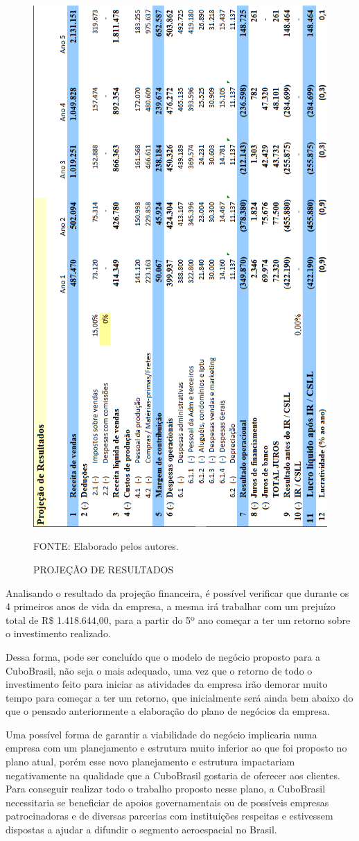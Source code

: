 \documentclass[
	12pt,				%
	openright,			%
	oneside,			%
	a4paper,			%
	english,			%
	french,				%
	spanish,			%
	brazil				%
	]{abntex2}
\begin{document}
	\begin{figure}[th]
		\caption{PROJEÇÃO DE RESULTADOS}
		\label{resultados}
		\centering
		\includegraphics[width=0.6\linewidth]{./figs/resultados}
		
		\begin{small}
			FONTE: Elaborado pelos autores.
		\end{small}
	\end{figure}
	\pagebreak
	
	Analisando o resultado da projeção financeira, é possível verificar que durante os 4 primeiros anos de vida da empresa, a mesma irá trabalhar com um prejuízo total de R\$ 1.418.644,00, para a partir do 5º ano começar a ter um retorno sobre o investimento realizado.
	
	Dessa forma, pode ser concluído que o modelo de negócio proposto para a CuboBrasil, não seja o mais adequado, uma vez que o retorno de todo o investimento feito para iniciar as atividades da empresa irão demorar muito tempo para começar a ter um retorno, que inicialmente será ainda bem abaixo do que o pensado anteriormente a elaboração do plano de negócios da empresa. 
	
	Uma possível forma de garantir a viabilidade do negócio implicaria numa empresa com um planejamento e estrutura muito inferior ao que foi proposto no plano atual, porém esse novo planejamento e estrutura impactariam negativamente na qualidade que a CuboBrasil gostaria de oferecer aos clientes. Para conseguir realizar todo o trabalho proposto nesse plano, a CuboBrasil necessitaria se beneficiar de apoios governamentais ou de possíveis empresas patrocinadoras e de diversas parcerias com instituições respeitas e estivessem dispostas a ajudar a difundir o segmento aeroespacial no Brasil.
\end{document}
